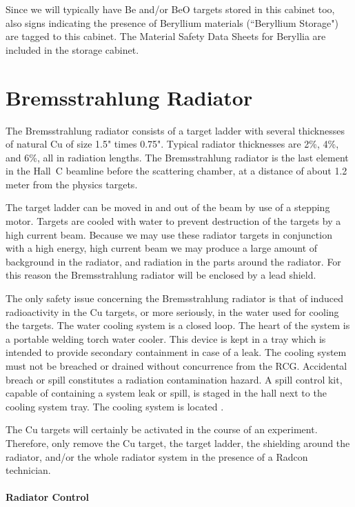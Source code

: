 {Since we will typically have
Be and/or BeO targets stored in this cabinet too, also signs indicating
the presence of Beryllium materials (``Beryllium Storage")
are tagged to this cabinet. The Material
Safety Data Sheets for Beryllia are included in the storage cabinet.



\section{Bremsstrahlung Radiator}

The Bremsstrahlung radiator consists of a target ladder with
several thicknesses of natural Cu of size 1.5" times 0.75".
Typical radiator thicknesses are 2\%, 4\%, and 6\%, all in
radiation lengths. The Bremsstrahlung radiator is the last element
in the Hall~C beamline before the scattering chamber, at a distance
of about 1.2 meter from the physics targets.

The target ladder can be moved in and out of the beam by use of
a stepping motor. Targets are cooled with water to prevent destruction
of the targets by a high current beam.
Because we may use these radiator targets in conjunction with a high
energy, high current beam we may produce a large amount of background
in the radiator, and radiation in the parts around the radiator.
For this reason the Bremsstrahlung radiator will be enclosed by a lead
shield.

The only safety issue concerning the Bremsstrahlung radiator is that of
induced radioactivity in
the Cu targets, or more seriously, in the water used for cooling the targets.
 The water cooling system is a closed loop. The heart of the system is
a portable welding torch water cooler. This device is kept in a tray
which is intended to provide secondary containment in case of a leak.
 The cooling system must not be breached or drained without concurrence from the RCG.  
Accidental breach or spill constitutes a radiation contamination hazard.  A spill control kit, 
capable of containing a system leak or spill, is staged in the hall next to the cooling system 
tray.  The cooling system is located    .

The Cu targets will certainly be activated in the course of an experiment.
Therefore, only remove
the Cu target, the target ladder, the shielding around the radiator,
and/or the whole radiator system in the presence of a Radcon technician.

\paragraph{Radiator Control}

}
